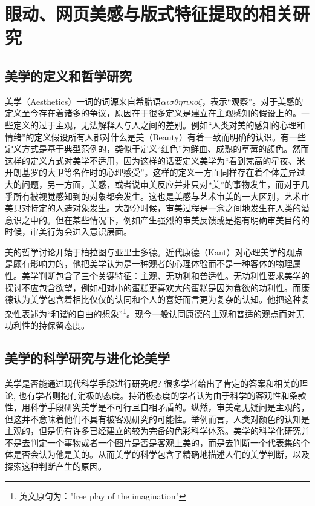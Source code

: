 \chapter{眼动、网页美感与版式特征提取的相关研究}
\label{chap:related}

\section{美学的定义和哲学研究}
美学（Aesthetics）一词的词源来自希腊语$\alpha\iota\sigma\theta\eta\tau\iota{\kappa}o\zeta$，表示“观察”。对于美感的定义至今存在着诸多的争议，原因在于很多定义是建立在主观感知的假设上的。一些定义的过于主观，无法解释人与人之间的差别。例如“人类对美的感知的心理和情绪”的定义假设所有人都对什么是美（Beauty）有着一致而明确的认识。有一些定义方式是基于典型范例的，类似于定义“红色”为鲜血、成熟的草莓的颜色。然而这样的定义方式对美学不适用，因为这样的话要定义美学为“看到梵高的星夜、米开朗基罗的大卫等名作时的心理感受”。这样的定义一方面同样存在着个体差异过大的问题，另一方面，美感，或者说审美反应并非只对“美”的事物发生，而对于几乎所有被视觉感知到的对象都会发生\cite{Palmer2012b, Reber2012}。这也是美感与艺术审美的一大区别，艺术审美只对特定的人造对象发生。大部分时候，审美过程是一念之间地发生在人类的潜意识之中的。但在某些情况下，例如产生强烈的审美反馈或是抱有明确审美目的的时候，审美行为会进入意识层面。

美的哲学讨论开始于柏拉图与亚里士多德。近代康德（Kant）对心理美学的观点是颇有影响力的，他把美学认为是一种观者的心理体验而不是一种客体的物理属性\cite{kant1892}。美学判断包含了三个关键特征：主观、无功利和普适性\cite{dickie1997}。无功利性要求美学的探讨不应包含欲望，例如相对小的蛋糕更喜欢大的蛋糕是因为食欲的功利性。而康德认为美学包含着相比仅仅的认同和个人的喜好而言更为复杂的认知。他把这种复杂性表述为“和谐的自由的想象”\footnote{英文原句为："free play of the imagination"}。现今一般认同康德的主观和普适的观点而对无功利性的持保留态度。

\section{美学的科学研究与进化论美学}
美学是否能通过现代科学手段进行研究呢? 很多学者给出了肯定的答案和相关的理论\cite{Arnheim1974, Berlyne1971, Fechner1876, Jacobsen2006, Shimamura2012}, 也有学者则抱有消极的态度\cite{Dickie1962}。持消极态度的学者认为由于科学的客观性和条款性，用科学手段研究美学是不可行且自相矛盾的。纵然，审美毫无疑问是主观的，但这并不意味着他们不具有被客观研究的可能性。举例而言，人类对颜色的认知是主观的，但是仍有许多已经建立的较为完备的色彩科学体系\cite{Kaiser1996, Koenderink2010}。美学的科学化研究并不是去判定一个事物或者一个图片是否是客观上美的，而是去判断一个代表集的个体是否会认为他是美的。从而美学的科学包含了精确地描述人们的美学判断，以及探索这种判断产生的原因。

